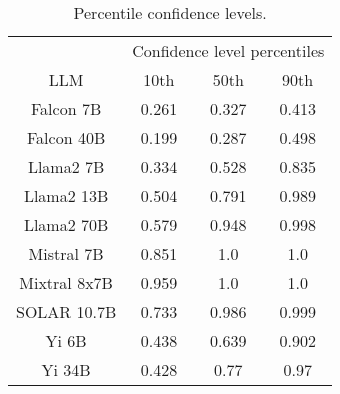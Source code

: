 \begin{table*}
\centering
\begin{tabular}{c|c|c|c}
& \multicolumn{3}{c}{Confidence level percentiles} \\ 
LLM & 10th & 50th & 90th\\ \hline
Falcon 7B & 0.261 & 0.327 & 0.413\\
Falcon 40B & 0.199 & 0.287 & 0.498\\
Llama2 7B & 0.334 & 0.528 & 0.835\\
Llama2 13B & 0.504 & 0.791 & 0.989\\
Llama2 70B & 0.579 & 0.948 & 0.998\\
Mistral 7B & 0.851 & 1.0 & 1.0\\
Mixtral 8x7B & 0.959 & 1.0 & 1.0\\
SOLAR 10.7B & 0.733 & 0.986 & 0.999\\
Yi 6B & 0.438 & 0.639 & 0.902\\
Yi 34B & 0.428 & 0.77 & 0.97\\
\hline
\end{tabular}
\caption{Percentile confidence levels.}
\label{tab:percentile_conf}
\end{table*}
